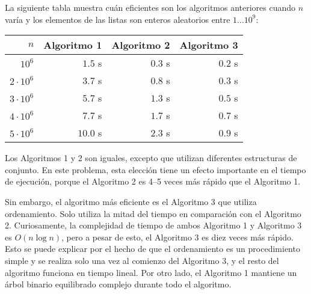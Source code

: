 La siguiente tabla muestra cuán eficientes
son los algoritmos anteriores cuando $n$ varía y
los elementos de las listas son enteros aleatorios
entre $1 \ldots 10^9$:

\begin{center}
\begin{tabular}{rrrr}
$n$ & Algoritmo 1 & Algoritmo 2 & Algoritmo 3 \\
\hline
$10^6$ & $1.5$ s & $0.3$ s & $0.2$ s \\
$2 \cdot 10^6$ & $3.7$ s & $0.8$ s & $0.3$ s \\
$3 \cdot 10^6$ & $5.7$ s & $1.3$ s & $0.5$ s \\
$4 \cdot 10^6$ & $7.7$ s & $1.7$ s & $0.7$ s \\
$5 \cdot 10^6$ & $10.0$ s & $2.3$ s & $0.9$ s \\
\end{tabular}
\end{center}

Los Algoritmos 1 y 2 son iguales, excepto que
utilizan diferentes estructuras de conjunto.
En este problema, esta elección tiene un efecto importante en
el tiempo de ejecución, porque el Algoritmo 2
es 4–5 veces más rápido que el Algoritmo 1.

Sin embargo, el algoritmo más eficiente es el Algoritmo 3
que utiliza ordenamiento.
Solo utiliza la mitad del tiempo en comparación con el Algoritmo 2.
Curiosamente, la complejidad de tiempo de ambos
Algoritmo 1 y Algoritmo 3 es $O(n \log n)$,
pero a pesar de esto, el Algoritmo 3 es diez veces más rápido.
Esto se puede explicar por el hecho de que
el ordenamiento es un procedimiento simple y se realiza
solo una vez al comienzo del Algoritmo 3,
y el resto del algoritmo funciona en tiempo lineal.
Por otro lado,
el Algoritmo 1 mantiene un árbol binario equilibrado complejo
durante todo el algoritmo.
